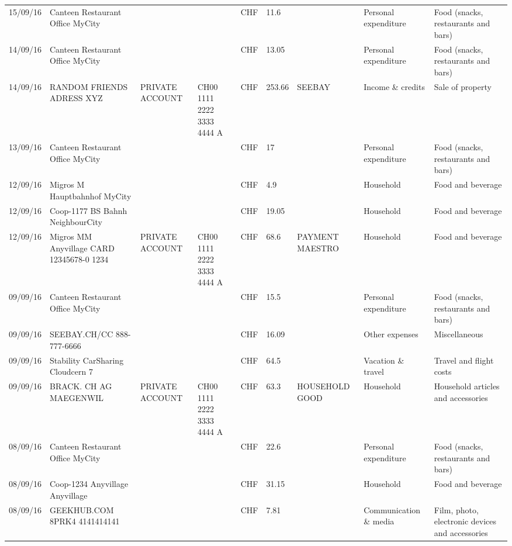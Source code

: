 \begin{landscape}
\begin{adjustwidth}{-2cm}{-2cm}
\begin{tiny}
\begin{longtable}{lp{4cm}llllp{3cm}ll}
		15/09/16 & Canteen Restaurant Office      MyCity &       &       & CHF   & 11.6  &       & Personal expenditure & Food (snacks, restaurants and bars) \\
		14/09/16 & Canteen Restaurant Office      MyCity &       &       & CHF   & 13.05 &       & Personal expenditure & Food (snacks, restaurants and bars) \\
		14/09/16 & RANDOM FRIENDS ADRESS XYZ & PRIVATE ACCOUNT & CH00 1111 2222 3333 4444 A & CHF   & 253.66 & SEEBAY & Income \& credits & Sale of property \\
		13/09/16 & Canteen Restaurant Office      MyCity &       &       & CHF   & 17    &       & Personal expenditure & Food (snacks, restaurants and bars) \\
		12/09/16 & Migros M Hauptbahnhof    MyCity &       &       & CHF   & 4.9   &       & Household & Food and beverage \\
		12/09/16 & Coop-1177 BS Bahnh       NeighbourCity &       &       & CHF   & 19.05 &       & Household & Food and beverage \\
		12/09/16 & Migros MM Anyvillage CARD 12345678-0 1234 & PRIVATE ACCOUNT & CH00 1111 2222 3333 4444 A & CHF   & 68.6  & PAYMENT MAESTRO & Household & Food and beverage \\
		09/09/16 & Canteen Restaurant Office      MyCity &       &       & CHF   & 15.5  &       & Personal expenditure & Food (snacks, restaurants and bars) \\
		09/09/16 & SEEBAY.CH/CC               888-777-6666 &       &       & CHF   & 16.09 &       & Other expenses & Miscellaneous \\
		09/09/16 & Stability CarSharing      Cloudcern 7 &       &       & CHF   & 64.5  &       & Vacation \& travel & Travel and flight costs \\
		09/09/16 & BRACK. CH AG MAEGENWIL & PRIVATE ACCOUNT & CH00 1111 2222 3333 4444 A & CHF   & 63.3  & HOUSEHOLD GOOD & Household & Household articles and accessories \\
		08/09/16 & Canteen Restaurant Office      MyCity &       &       & CHF   & 22.6  &       & Personal expenditure & Food (snacks, restaurants and bars) \\
		08/09/16 & Coop-1234 Anyvillage    Anyvillage &       &       & CHF   & 31.15 &       & Household & Food and beverage \\
		08/09/16 & GEEKHUB.COM  8PRK4        4141414141 &       &       & CHF   & 7.81  &       & Communication \& media & Film, photo, electronic devices and accessories \\

\end{longtable}
\end{tiny}
\end{adjustwidth}
\end{landscape}
